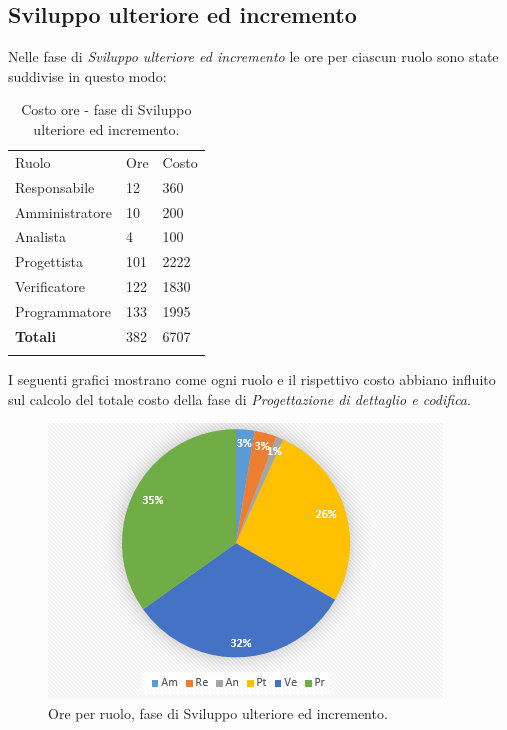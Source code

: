 \documentclass[a4paper]{article}
\begin{document}
		\subsection{Sviluppo ulteriore ed incremento}
			Nelle fase di \emph{Sviluppo ulteriore ed incremento} le ore per ciascun ruolo sono state suddivise in questo modo:
			\begin{table}[H]
				\begin{tabularx}{\textwidth}{Y Y Y}
					Ruolo & Ore & Costo \\
					Responsabile & 12 & 360 \\
					Amministratore & 10 & 200 \\
					Analista & 4 & 100\\
					Progettista & 101 & 2222\\
					Verificatore & 122 & 1830\\
					Programmatore & 133 & 1995 \\
					\textbf{Totali} & 382 & 6707 \\
				\end{tabularx}
				\caption{Costo ore - fase di Sviluppo ulteriore ed incremento. }
				\label{TCCodifica}
			\end{table}
			I seguenti grafici mostrano come ogni ruolo e il rispettivo costo abbiano influito sul calcolo del totale 
			costo della fase di \emph{Progettazione di dettaglio e codifica}.
			\begin{figure}[H]
				\centering
				\includegraphics[scale=0.7]{pc_incremento}
				\caption{Ore per ruolo, fase di Sviluppo ulteriore ed incremento.}
			\end{figure}
\end{document}
